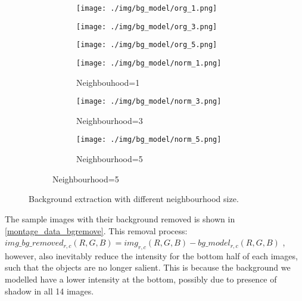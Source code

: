 \documentclass[main.tex]{subfiles}
\begin{document}
\begin{figure}[!h]
  \centering
  \begin{subfigure}[t]{\textwidth}
    \centering
    \begin{subfigure}[t]{.3\textwidth} %
        \centering
        \texttt{[image: ./img/bg\_model/org\_1.png]}
    \end{subfigure}
    \begin{subfigure}[t]{.3\textwidth} %
        \centering
        \texttt{[image: ./img/bg\_model/org\_3.png]}
    \end{subfigure}
    \begin{subfigure}[t]{.3\textwidth} %
        \centering
        \texttt{[image: ./img/bg\_model/org\_5.png]}
    \end{subfigure}
  \end{subfigure} %
  \begin{subfigure}[b]{\textwidth}
    \centering
    \begin{subfigure}[t]{.3\textwidth} %
        \centering
        \texttt{[image: ./img/bg\_model/norm\_1.png]}
        \caption{Neighbouhood=1}
    \end{subfigure}
    \begin{subfigure}[t]{.3\textwidth} %
        \centering
        \texttt{[image: ./img/bg\_model/norm\_3.png]}
        \caption{Neighbourhood=3}
    \end{subfigure}
    \begin{subfigure}[t]{.3\textwidth} %
        \centering
        \texttt{[image: ./img/bg\_model/norm\_5.png]}
        \caption{Neighbourhood=5}
    \end{subfigure}
  \end{subfigure}
  \caption{Background extraction with different neighbourhood size.}
  \label{montage_bg}
\end{figure}


The sample images with their background removed is shown in \autoref{montage_data_bgremove}. This removal process: $img\_bg\_removed_{r,c}(R,G,B) = img_{r,c}(R,G,B) - bg\_model_{r,c}(R,G,B)$ , however, also inevitably reduce the intensity for the bottom half of each images, such that the objects are no longer salient. This is because the background we modelled have a lower intensity at the bottom, possibly due to presence of shadow in all 14 images.
\end{document}
